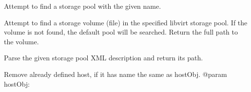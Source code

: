 \documentclass[letterpaper,10pt,english]{sphinxmanual}
\begin{document}
\begin{fulllineitems}
\begin{fulllineitems}
\end{fulllineitems}


\begin{fulllineitems}
\label{ref-manual/XrdTest:XrdTest.ClusterManager.ClusterManager.findStoragePool}
Attempt to find a storage pool with the given name.

\end{fulllineitems}


\begin{fulllineitems}
\label{ref-manual/XrdTest:XrdTest.ClusterManager.ClusterManager.findStorageVolume}
Attempt to find a storage volume (file) in the specified libvirt storage
pool. If the volume is not found, the default pool will be searched. Return
the full path to the volume.

\end{fulllineitems}


\begin{fulllineitems}
\label{ref-manual/XrdTest:XrdTest.ClusterManager.ClusterManager.getPoolPath}
Parse the given storage pool XML description and return its
path.

\end{fulllineitems}


\begin{fulllineitems}
\label{ref-manual/XrdTest:XrdTest.ClusterManager.ClusterManager.removeCluster}
\end{fulllineitems}


\begin{fulllineitems}
\label{ref-manual/XrdTest:XrdTest.ClusterManager.ClusterManager.removeDanglingHost}
Remove already defined host, if it has name the same as hostObj.
@param hostObj:


\end{fulllineitems}
\end{fulllineitems}
\end{document}
